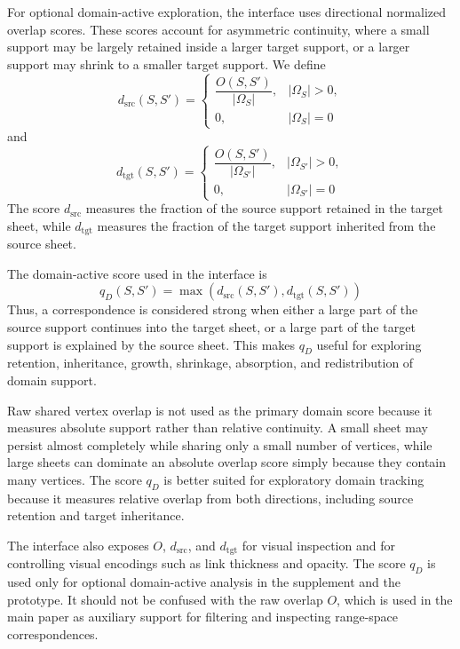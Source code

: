 \documentclass[review]{vgtc}
\newcommand{\Sheet}{S}
\begin{document}
For optional domain-active exploration, the interface uses directional normalized overlap scores. These scores account for asymmetric continuity, where a small support may be largely retained inside a larger target support, or a larger support may shrink to a smaller target support. We define
$$
d_\mathrm{src}(\Sheet,\Sheet') =
\begin{cases}
\dfrac{O(\Sheet,\Sheet')}{|\Omega_\Sheet|}, & |\Omega_\Sheet|>0,\\
0, & |\Omega_\Sheet|=0
\end{cases}
$$
and
$$
d_\mathrm{tgt}(\Sheet,\Sheet') =
\begin{cases}
\dfrac{O(\Sheet,\Sheet')}{|\Omega_{\Sheet'}|}, & |\Omega_{\Sheet'}|>0,\\
0, & |\Omega_{\Sheet'}|=0
\end{cases}
$$
The score $d_\mathrm{src}$ measures the fraction of the source support retained in the target sheet, while $d_\mathrm{tgt}$ measures the fraction of the target support inherited from the source sheet.

The domain-active score used in the interface is
$$
q_D(\Sheet,\Sheet') =
\max\left(
d_\mathrm{src}(\Sheet,\Sheet'),
d_\mathrm{tgt}(\Sheet,\Sheet')
\right)
$$
Thus, a correspondence is considered strong when either a large part of the source support continues into the target sheet, or a large part of the target support is explained by the source sheet. This makes $q_D$ useful for exploring retention, inheritance, growth, shrinkage, absorption, and redistribution of domain support.

Raw shared vertex overlap is not used as the primary domain score because it measures absolute support rather than relative continuity. A small sheet may persist almost completely while sharing only a small number of vertices, while large sheets can dominate an absolute overlap score simply because they contain many vertices. The score $q_D$ is better suited for exploratory domain tracking because it measures relative overlap from both directions, including source retention and target inheritance.

The interface also exposes $O$, $d_\mathrm{src}$, and $d_\mathrm{tgt}$ for visual inspection and for controlling visual encodings such as link thickness and opacity. The score $q_D$ is used only for optional domain-active analysis in the supplement and the prototype. It should not be confused with the raw overlap $O$, which is used in the main paper as auxiliary support for filtering and inspecting range-space correspondences.
\end{document}
